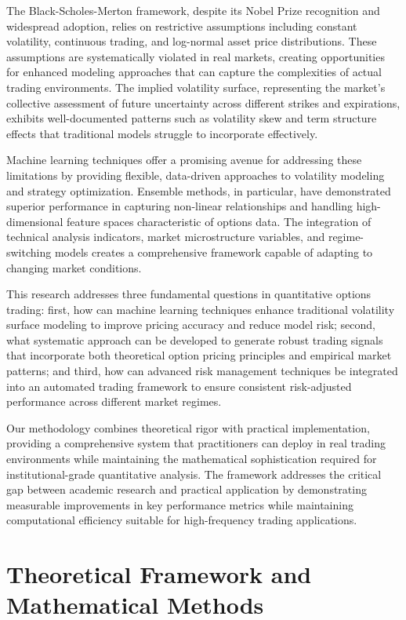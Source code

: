 \documentclass[12pt,a4paper]{article}
\begin{document}
The Black-Scholes-Merton framework, despite its Nobel Prize recognition and widespread adoption, relies on restrictive assumptions including constant volatility, continuous trading, and log-normal asset price distributions. These assumptions are systematically violated in real markets, creating opportunities for enhanced modeling approaches that can capture the complexities of actual trading environments. The implied volatility surface, representing the market's collective assessment of future uncertainty across different strikes and expirations, exhibits well-documented patterns such as volatility skew and term structure effects that traditional models struggle to incorporate effectively.

Machine learning techniques offer a promising avenue for addressing these limitations by providing flexible, data-driven approaches to volatility modeling and strategy optimization. Ensemble methods, in particular, have demonstrated superior performance in capturing non-linear relationships and handling high-dimensional feature spaces characteristic of options data. The integration of technical analysis indicators, market microstructure variables, and regime-switching models creates a comprehensive framework capable of adapting to changing market conditions.

This research addresses three fundamental questions in quantitative options trading: first, how can machine learning techniques enhance traditional volatility surface modeling to improve pricing accuracy and reduce model risk; second, what systematic approach can be developed to generate robust trading signals that incorporate both theoretical option pricing principles and empirical market patterns; and third, how can advanced risk management techniques be integrated into an automated trading framework to ensure consistent risk-adjusted performance across different market regimes.

Our methodology combines theoretical rigor with practical implementation, providing a comprehensive system that practitioners can deploy in real trading environments while maintaining the mathematical sophistication required for institutional-grade quantitative analysis. The framework addresses the critical gap between academic research and practical application by demonstrating measurable improvements in key performance metrics while maintaining computational efficiency suitable for high-frequency trading applications.

\section{Theoretical Framework and Mathematical Methods}
\end{document}
